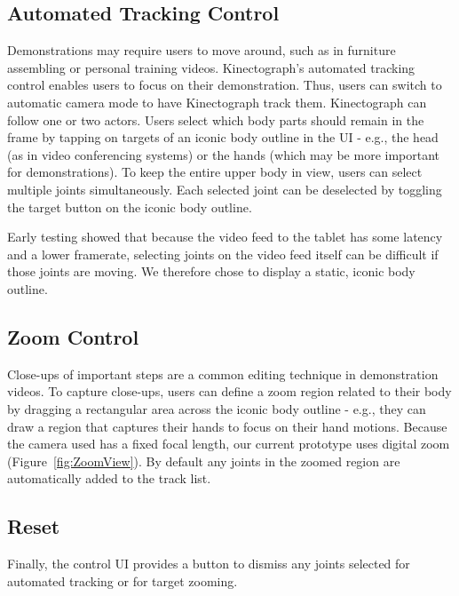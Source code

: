 \subsection{Automated Tracking Control}
Demonstrations may require users to move around, such as in furniture assembling or personal training videos. Kinectograph's automated tracking control enables users to focus on their demonstration. Thus, users can switch to automatic camera mode to have Kinectograph track them. Kinectograph can follow one or two actors. Users select which body parts should remain in the frame by tapping on targets of an iconic body outline in the UI - e.g., the head (as in video conferencing systems) or the hands (which may be more important for demonstrations). To keep the entire upper body in view, users can select multiple joints simultaneously. Each selected joint can be deselected by toggling the target button on the iconic body outline.

Early testing showed that because the video feed to the tablet has some latency and a lower framerate, selecting joints on the video feed itself can be difficult if those joints are moving. We therefore chose to display a static, iconic body outline.


\subsection{Zoom Control}
Close-ups of important steps are a common editing technique in demonstration videos. To capture close-ups, users can define a zoom region related to their body by dragging a rectangular area across the iconic body outline - e.g., they can draw a region that captures their hands to focus on their hand motions. Because the camera used has a fixed focal length, our current prototype uses digital zoom (Figure~\ref{fig:ZoomView}). By default any joints in the zoomed region are automatically added to the track list.

\subsection{Reset}
Finally, the control UI provides a button to dismiss any joints selected for automated tracking or for target zooming.

